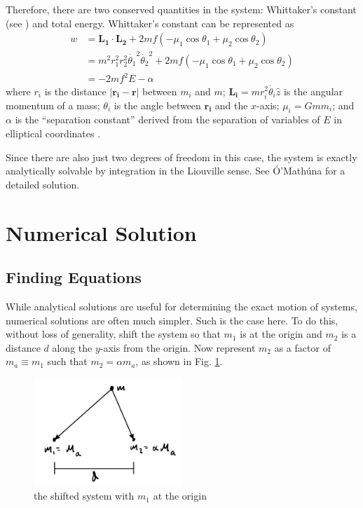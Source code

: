 \documentclass[preprint,titlepage,preprintnumbers,amsmath,amssymb,aps,11pt]{revtex4-2}
\begin{document}
Therefore, there are two conserved quantities in the system: Whittaker's constant (see \cite[p. 100]{Krishnaswami2019}) and total energy. Whittaker's constant can be represented as
\begin{equation}
    \begin{aligned}
        w & =\bm{L_1}\cdot\bm{L_2}+2mf(-\mu _1 \cos{\theta _1} +\mu _2 \cos{\theta _2})                           \\
          & =m^2r_1^2r_2^2\dot{\theta _1}^2\dot{\theta _2}^2+2mf(-\mu _1 \cos{\theta _1} +\mu _2 \cos{\theta _2}) \\
          & =-2mf^2E-\alpha
    \end{aligned}
\end{equation}
where $r_i$ is the distance $|\bm{r_i}-\bm{r}|$ between $m_i$ and $m$; $\bm{L_i}=mr_i^2\dot{\theta _i}\hat{z}$ is the angular momentum of a mass; $\theta _i$ is the angle between $\bm{r_i}$ and the $x$-axis; $\mu _i=Gmm_i$; and $\alpha$ is the “separation constant” derived from the separation of variables of $E$ in elliptical coordinates \cite[p. 101]{Krishnaswami2019}.

Since there are also just two degrees of freedom in this case, the system is exactly analytically solvable by integration in the Liouville sense. See Ó'Mathúna \cite[pages 49-105 and 113-142]{OMathuna2008} for a detailed solution.

\section{Numerical Solution}\label{sec:numerical}

\subsection{Finding Equations}\label{sec:equations}
While analytical solutions are useful for determining the exact motion of systems, numerical solutions are often much simpler. Such is the case here.
To do this, without loss of generality, shift the system so that $m_1$ is at the origin and $m_2$ is a distance $d$ along the $y$-axis from the origin. Now represent $m_2$ as a factor of $m_a\equiv m_1$ such that $m_2=\alpha m_a$, as shown in Fig. \ref{fig:shiftedsys}.
\begin{figure}
    \centering
    \includegraphics[width=0.5\textwidth]{Fig 3.jpeg}
    \caption{the shifted system with $m_1$ at the origin}
    \label{fig:shiftedsys}
\end{figure}
\end{document}
